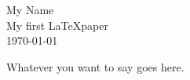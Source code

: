 \documentclass[12pt,letterpaper]{article}
\author{Benjamin Oakes}
\begin{document}
\linespread{1} %
\small \normalsize %
\begin{flushright}
My Name \\
My first \LaTeX paper \\
\today
\end{flushright}

Whatever you want to say goes here.
\end{document}
